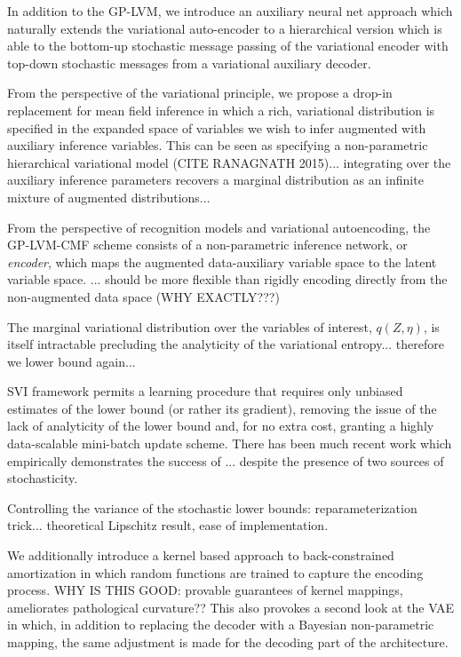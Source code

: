 \documentclass[]{article}
\begin{document}
In addition to the GP-LVM, we introduce an auxiliary neural net approach which naturally extends the variational auto-encoder to a hierarchical version which is able to the bottom-up stochastic message passing of the variational encoder with top-down stochastic messages from a variational auxiliary decoder.

From the perspective of the variational principle, we propose a drop-in replacement for mean field inference in which a rich, variational distribution is specified in the expanded space of variables we wish to infer augmented with auxiliary inference variables.
This can be seen as specifying a non-parametric hierarchical variational model (CITE RANAGNATH 2015)... integrating over the auxiliary inference parameters recovers a marginal distribution as an infinite mixture of augmented distributions...

From the perspective of recognition models and variational autoencoding, the GP-LVM-CMF scheme consists of a non-parametric inference network, or \emph{encoder}, which maps the augmented data-auxiliary variable space to the latent variable space. ... should be more flexible than rigidly encoding directly from the non-augmented data space (WHY EXACTLY???)

The marginal variational distribution over the variables of interest, $q(Z,\eta)$, is itself intractable precluding the analyticity of the variational entropy... therefore we lower bound again...

SVI framework permits a learning procedure that requires only unbiased estimates of the lower bound (or rather its gradient), removing the issue of the lack of analyticity of the lower bound and, for no extra cost, granting a highly data-scalable mini-batch update scheme.
There has been much recent work which empirically demonstrates the success of ... despite the presence of two sources of stochasticity.

Controlling the variance of the stochastic lower bounds: reparameterization trick... theoretical Lipschitz result, ease of implementation.


We additionally introduce a kernel based approach to back-constrained amortization in which random functions are trained to capture the encoding process.
WHY IS THIS GOOD: provable guarantees of kernel mappings, ameliorates pathological curvature??
This also provokes a second look at the VAE in which, in addition to replacing the decoder with a Bayesian non-parametric mapping, the same adjustment is made for the decoding part of the architecture.
\end{document}

